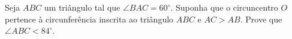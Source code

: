 Seja $ABC$ um triângulo tal que $\angle BAC = 60^\circ$. Suponha que o circuncentro $O$ pertence à circunferência inscrita ao triângulo $ABC$ e $AC > AB$. Prove que $\angle ABC < 84^\circ$.
